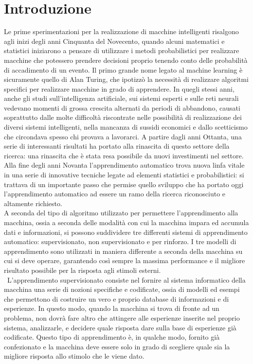 \documentclass[12pt,a4paper]{report}
\begin{document}
\chapter{Introduzione}
\par
Le prime sperimentazioni per la realizzazione di macchine intelligenti risalgono agli inizi degli anni Cinquanta del Novecento, quando alcuni matematici e statistici iniziarono a pensare di utilizzare i metodi probabilistici per realizzare macchine che potessero prendere decisioni proprio tenendo conto delle probabilità di accadimento di un evento. Il primo grande nome legato al machine learning è sicuramente quello di Alan Turing, che ipotizzò la necessità di realizzare algoritmi specifici per realizzare macchine in grado di apprendere. In quegli stessi anni, anche gli studi sull’intelligenza artificiale, sui sistemi esperti e sulle reti neurali vedevano momenti di grossa crescita alternati da periodi di abbandono, causati soprattutto dalle molte difficoltà riscontrate nelle possibilità di realizzazione dei diversi sistemi intelligenti, nella mancanza di sussidi economici e dallo scetticismo che circondava spesso chi provava a lavorarci. A partire dagli anni Ottanta, una serie di interessanti risultati ha portato alla rinascita di questo settore della ricerca: una rinascita che è stata resa possibile da nuovi investimenti nel settore. Alla fine degli anni Novanta l’apprendimento automatico trova nuova linfa vitale in una serie di innovative tecniche legate ad elementi statistici e probabilistici: si trattava di un importante passo che permise quello sviluppo che ha portato oggi l’apprendimento automatico ad essere un ramo della ricerca riconosciuto e altamente richiesto.\\
A seconda del tipo di algoritmo utilizzato per permettere l’apprendimento alla macchina, ossia a seconda delle modalità con cui la macchina impara ed accumula dati e informazioni, si possono suddividere tre differenti sistemi di apprendimento automatico: supervisionato, non supervisionato e per rinforzo.
I tre modelli di apprendimento sono utilizzati in maniera differente a seconda della macchina su cui si deve operare, garantendo così sempre la massima performance e il migliore risultato possibile per la risposta agli stimoli esterni.
\\\
L’apprendimento supervisionato consiste nel fornire al sistema informatico della macchina una serie di nozioni specifiche e codificate, ossia di modelli ed esempi che permettono di costruire un vero e proprio database di informazioni e di esperienze. In questo modo, quando la macchina si trova di fronte ad un problema, non dovrà fare altro che attingere alle esperienze inserite nel proprio sistema, analizzarle, e decidere quale risposta dare sulla base di esperienze già codificate. Questo tipo di apprendimento è, in qualche modo, fornito già confezionato e la macchina deve essere solo in grado di scegliere quale sia la migliore risposta allo stimolo che le viene dato.\\\
\end{document}
